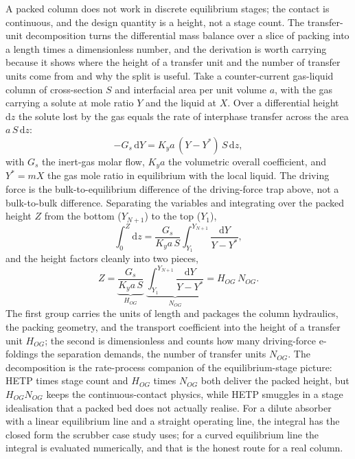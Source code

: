  A packed column does not work
in discrete equilibrium stages; the contact is continuous, and the design
quantity is a height, not a stage count. The transfer-unit decomposition
turns the differential mass balance over a slice of packing into a length
times a dimensionless number, and the derivation is worth carrying because
it shows where the height of a transfer unit and the number of transfer
units come from and why the split is useful. Take a counter-current
gas-liquid column of cross-section $S$ and interfacial area per unit volume
$a$, with the gas carrying a solute at mole ratio $Y$ and the liquid at
$X$. Over a differential height $\mathrm{d}z$ the solute lost by the gas
equals the rate of interphase transfer across the area $a\,S\,\mathrm{d}z$:
\[
-G_s\,\mathrm{d}Y = K_y a\,(Y - Y^{*})\,S\,\mathrm{d}z,
\]
with $G_s$ the inert-gas molar flow, $K_y a$ the volumetric overall
coefficient, and $Y^{*} = mX$ the gas mole ratio in equilibrium with the
local liquid. The driving force is the bulk-to-equilibrium difference of
the driving-force trap above, not a bulk-to-bulk difference. Separating
the variables and integrating over the packed height $Z$ from the bottom
($Y_{N+1}$) to the top ($Y_1$),
\[
\int_0^Z \mathrm{d}z = \frac{G_s}{K_y a\,S}\int_{Y_1}^{Y_{N+1}}
\frac{\mathrm{d}Y}{Y - Y^{*}},
\]
and the height factors cleanly into two pieces,
\[
Z = \underbrace{\frac{G_s}{K_y a\,S}}_{H_{OG}}\;
\underbrace{\int_{Y_1}^{Y_{N+1}}\frac{\mathrm{d}Y}{Y - Y^{*}}}_{N_{OG}}
= H_{OG}\,N_{OG}.
\]
The first group carries the units of length and packages the column
hydraulics, the packing geometry, and the transport coefficient into the
height of a transfer unit $H_{OG}$; the second is dimensionless and counts
how many driving-force e-foldings the separation demands, the number of
transfer units $N_{OG}$. The decomposition is the rate-process companion
of the equilibrium-stage picture: HETP times stage count and $H_{OG}$
times $N_{OG}$ both deliver the packed height, but $H_{OG}N_{OG}$ keeps
the continuous-contact physics, while HETP smuggles in a stage idealisation
that a packed bed does not actually realise. For a dilute absorber with a
linear equilibrium line and a straight operating line, the integral has
the closed form the scrubber case study uses; for a curved equilibrium
line the integral is evaluated numerically, and that is the honest route
for a real column.

